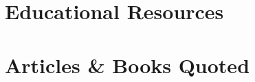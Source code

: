 \documentclass{article}
\numberwithin{equation}{section}
\begin{document}

\section{Educational Resources}


\section{Articles \& Books Quoted}


\printbibliography[heading=bibintoc]
	
\end{document}
